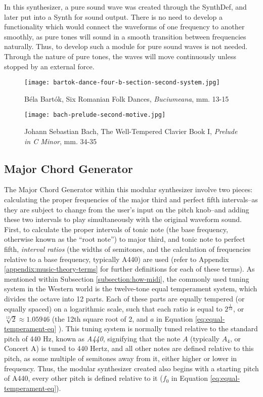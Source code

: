 In this synthesizer, a pure sound wave was created through the SynthDef, and later put into a Synth for sound output. There is no need to develop a functionality which would connect the waveforms of one frequency to another smoothly, as pure tones will sound in a smooth transition between frequencies naturally. Thus, to develop such a module for pure sound waves is not needed. Through the nature of pure tones, the waves will move continuously unless stopped by an external force. 

\begin{figure}[h]
  \centering
  \texttt{[image: bartok-dance-four-b-section-second-system.jpg]}
  \caption{Béla Bartók, Six Romanian Folk Dances, \textit{Buciumeana},  mm. 13-15}
  \label{fig:legato-notes-example}
\end{figure}

\begin{figure}[h]
  \centering
  \texttt{[image: bach-prelude-second-motive.jpg]}
  \caption{Johann Sebastian Bach, The Well-Tempered Clavier Book I, \textit{Prelude in C Minor}, mm. 34-35}
  \label{fig:tied-notes-example}
\end{figure}

\subsection{Major Chord Generator}

The Major Chord Generator within this modular synthesizer involve two pieces: calculating the proper frequencies of the major third and perfect fifth intervals--as they are subject to change from the user's input on the pitch knob--and adding these two intervals to play simultaneously with the original waveform sound. First, to calculate the proper intervals of tonic note (the base frequency, otherwise known as the ``root note'') to major third, and tonic note to perfect fifth, \textit{interval ratios} (the widths of semitones, and the calculation of frequencies relative to a base frequency, typically A440) are used (refer to Appendix \ref{appendix:music-theory-terms} for further definitions for each of these terms). As mentioned within Subsection \ref{subsection:how-midi}, the commonly used tuning system in the Western world is the twelve-tone equal temperament system, which divides the octave into 12 parts. Each of these parts are equally tempered (or equally spaced) on a logarithmic scale, such that each ratio is equal to $2^\frac{1}{12}$, or $\sqrt[12]{2} \approx 1.05946$ (the 12th square root of 2, and $a$ in Equation \ref{eq:equal-temperament-eq} \cite{Suits_1998}). This tuning system is normally tuned relative to the standard pitch of 440 Hz, known as \textit{A440}, signifying that the note $A$ (typically $A_4$, or Concert A) is tuned to 440 Hertz, and all other notes are defined relative to this pitch, as some multiple of semitones away from it, either higher or lower in frequency. Thus,  the modular synthesizer created also begins with a starting pitch of A440, every other pitch is defined relative to it ($f_0$ in Equation \ref{eq:equal-temperament-eq}).


